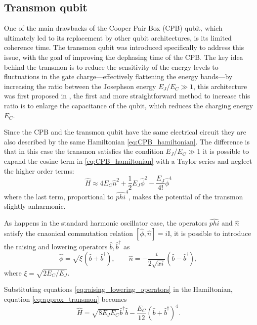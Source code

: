 \subsection{Transmon qubit}
One of the main drawbacks of the Cooper Pair Box (CPB) qubit, which ultimately led to its replacement by other qubit architectures, is its limited coherence time. 
The transmon qubit was introduced specifically to address this issue, with the goal of improving the dephasing time of the CPB. The key idea behind the transmon is to reduce the sensitivity of the energy levels to fluctuations in the gate charge—effectively flattening the energy bands—by increasing the ratio between the Josephson energy $E_J/E_C \gg 1$,
this architecture was first proposed in \cite{TransmonPaper}, the first and more straightforward method to increase this ratio is to enlarge the capacitance of the qubit, which reduces the charging energy $E_C$.

Since the CPB and the transmon qubit have the same electrical circuit they are also described by the same Hamiltonian \ref{eq:CPB_hamiltonian}. 
The difference is that in this case the transmon satisfies the condition $E_J/E_C \gg 1$ it is possible to expand the cosine term in \ref{eq:CPB_hamiltonian} with a Taylor series and neglect the higher order terms:
\begin{equation}\label{eq:approx_transmon}
    \hat{H}\approx 4E_C\hat{n}^2 + \frac{1}{2}E_J\hat{\phi}^2 - \frac{E_J}{4!}\hat{\phi}^4
\end{equation}
where the last term, proportional to $\hat{phi}^4$, makes the potential of the transmon slightly anharmonic.

As happens in the standard harmonic oscillator case, the operators $\hat{phi}$ and $\hat{n}$ satisfy the cnaonical commutation relation $[\hat{\phi},\hat{n}]=i\mathbb{I}$, it is possible to introduce the raising and lowering operators $\hat{b},\hat{b}^\dagger$ as
\begin{equation}\label{eq:raising_lowering_operators}
    \hat{\phi} = \sqrt{\xi}(\hat{b}+\hat{b}^\dagger), \quad\quad \hat{n} = -\frac{i}{2\sqrt{xi}}(\hat{b}-\hat{b}^\dagger),
\end{equation}
where $\xi =  \sqrt{2E_C/E_J}$.

Substituting equations \ref{eq:raising_lowering_operators} in the Hamiltonian, equation \ref{eq:approx_transmon} becomes
\begin{equation}\label{eq:transmon_hamiltonian}
    \hat{H} = \sqrt{8E_JE_C}\hat{b}^\dagger\hat{b} - \frac{E_C}{12}(\hat{b}+\hat{b}^\dagger)^4.
\end{equation}

